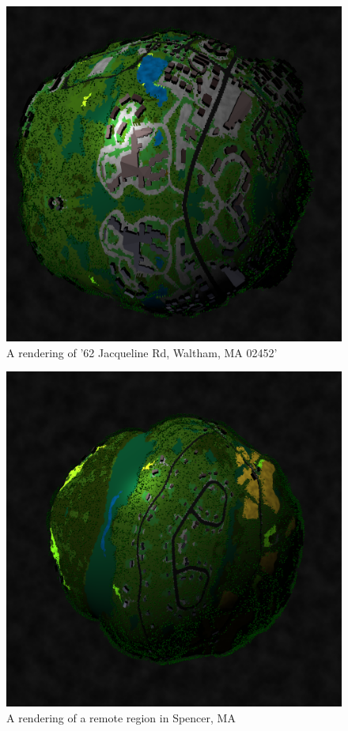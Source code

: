 \documentclass{amsart}
\begin{document}
\begin{figure}[H]
      \caption{A rendering of '62 Jacqueline Rd, Waltham, MA 02452'}
      \begin{center}
            \includegraphics[width=4.5in]{../results/r2.png}
      \end{center}
\end{figure}

\begin{figure}[H]
      \caption{A rendering of a remote region in Spencer, MA}
      \begin{center}
            \includegraphics[width=4.5in]{../results/r3.png}
      \end{center}
\end{figure}
\end{document}
